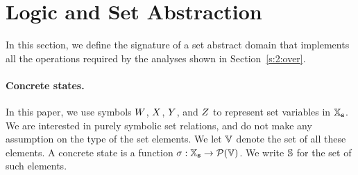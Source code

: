 \section{Logic and Set Abstraction}
\label{sec:logic-and-set-abstraction} \label{s:3:abs}
In this section, we define the signature of a set abstract domain that
implements all the operations required by the analyses shown in
Section~\ref{s:2:over}.

\paragraph{Concrete states.}
In this paper, we use symbols $W$, $X$, $Y$, and $Z$
to represent set variables in $\mathbb{X}_{\bf s}$.
We are interested in purely symbolic set relations, and do not make any
assumption on the type of the set elements.
We let \( \mathbb{V} \) denote the set of all these elements.
A concrete state is a function \( \sigma: \mathbb{X}_{\bf s} \rightarrow
\mathcal{P}(\mathbb{V}) \).
We write \( \mathbb{S} \) for the set of such elements.

